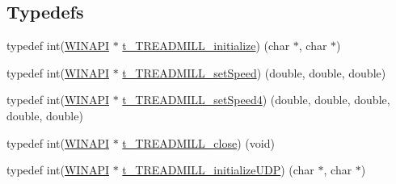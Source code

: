 \subsection*{Typedefs}
\begin{DoxyCompactItemize}
\item 
typedef int(\hyperlink{treadmill-remote_8h_a9aa60e1ead64be77ad551e745cbfd4d3}{W\+I\+N\+A\+PI} $\ast$ \hyperlink{treadmill-remote_8h_adceddd065a9a32e0b6b200883317ea01}{t\+\_\+\+T\+R\+E\+A\+D\+M\+I\+L\+L\+\_\+initialize}) (char $\ast$, char $\ast$)
\item 
typedef int(\hyperlink{treadmill-remote_8h_a9aa60e1ead64be77ad551e745cbfd4d3}{W\+I\+N\+A\+PI} $\ast$ \hyperlink{treadmill-remote_8h_aa57ca1424e45e36a7d49b5965f045d65}{t\+\_\+\+T\+R\+E\+A\+D\+M\+I\+L\+L\+\_\+set\+Speed}) (double, double, double)
\item 
typedef int(\hyperlink{treadmill-remote_8h_a9aa60e1ead64be77ad551e745cbfd4d3}{W\+I\+N\+A\+PI} $\ast$ \hyperlink{treadmill-remote_8h_ab6f42b69947e7d9bc7b968152eeadcd6}{t\+\_\+\+T\+R\+E\+A\+D\+M\+I\+L\+L\+\_\+set\+Speed4}) (double, double, double, double, double)
\item 
typedef int(\hyperlink{treadmill-remote_8h_a9aa60e1ead64be77ad551e745cbfd4d3}{W\+I\+N\+A\+PI} $\ast$ \hyperlink{treadmill-remote_8h_a43fd64b472e18efee7fddae738cf3b3c}{t\+\_\+\+T\+R\+E\+A\+D\+M\+I\+L\+L\+\_\+close}) (void)
\item 
typedef int(\hyperlink{treadmill-remote_8h_a9aa60e1ead64be77ad551e745cbfd4d3}{W\+I\+N\+A\+PI} $\ast$ \hyperlink{treadmill-remote_8h_afe196739d6358daf42af0f94c181ba55}{t\+\_\+\+T\+R\+E\+A\+D\+M\+I\+L\+L\+\_\+initialize\+U\+DP}) (char $\ast$, char $\ast$)
\end{DoxyCompactItemize}

